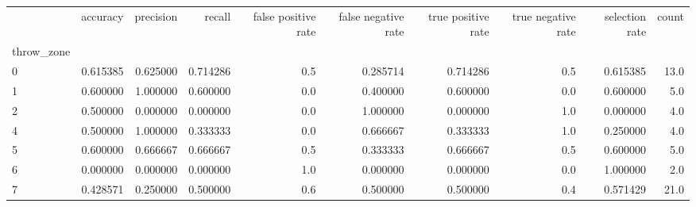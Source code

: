 \begin{tabular}{lrrrrrrrrr}
\toprule
{} &  accuracy &  precision &    recall &  false positive rate &  false negative rate &  true positive rate &  true negative rate &  selection rate &  count \\
throw\_zone &           &            &           &                      &                      &                     &                     &                 &        \\
\midrule
0          &  0.615385 &   0.625000 &  0.714286 &                  0.5 &             0.285714 &            0.714286 &                 0.5 &        0.615385 &   13.0 \\
1          &  0.600000 &   1.000000 &  0.600000 &                  0.0 &             0.400000 &            0.600000 &                 0.0 &        0.600000 &    5.0 \\
2          &  0.500000 &   0.000000 &  0.000000 &                  0.0 &             1.000000 &            0.000000 &                 1.0 &        0.000000 &    4.0 \\
4          &  0.500000 &   1.000000 &  0.333333 &                  0.0 &             0.666667 &            0.333333 &                 1.0 &        0.250000 &    4.0 \\
5          &  0.600000 &   0.666667 &  0.666667 &                  0.5 &             0.333333 &            0.666667 &                 0.5 &        0.600000 &    5.0 \\
6          &  0.000000 &   0.000000 &  0.000000 &                  1.0 &             0.000000 &            0.000000 &                 0.0 &        1.000000 &    2.0 \\
7          &  0.428571 &   0.250000 &  0.500000 &                  0.6 &             0.500000 &            0.500000 &                 0.4 &        0.571429 &   21.0 \\
\bottomrule
\end{tabular}
